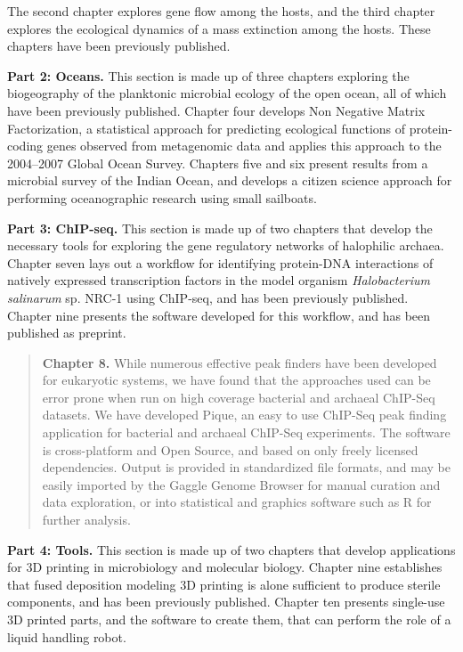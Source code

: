The second chapter explores gene flow among the hosts, \cite{mcgee2016evaluating} and the third chapter explores the ecological dynamics of a mass extinction among the hosts. \cite{mcgee2015pharyngeal} These chapters have been previously published. 

\noindent\textbf{Part 2: Oceans.}
This section is made up of three chapters exploring the biogeography of the planktonic microbial ecology of the open ocean, all of which have been previously published. Chapter four develops Non Negative Matrix Factorization, a statistical approach for predicting ecological functions of protein-coding genes observed from metagenomic data and applies this approach to the 2004--2007 Global Ocean Survey. \cite{jiang2012functional} Chapters five and six present results from a microbial survey of the Indian Ocean, and develops a citizen science approach for performing oceanographic research using small sailboats. \cite{jeffries2015spatially, lauro2014common}

\noindent\textbf{Part 3: ChIP-seq.}
This section is made up of two chapters that develop the necessary tools for exploring the gene regulatory networks of halophilic archaea. Chapter seven lays out a workflow for identifying protein-DNA interactions of natively expressed transcription factors in the model organism {\em Halobacterium salinarum} sp. NRC-1 using ChIP-seq, and has been previously published. \cite{wilbanks2012workflow} Chapter nine presents the software developed for this workflow, and has been published as preprint. \cite{neches2014fit}

\begin{quote} \noindent\textbf{Chapter 8.} While numerous effective peak
finders have been developed for eukaryotic systems, we have found that the
approaches used can be error prone when run on high coverage bacterial and
archaeal ChIP-Seq datasets. We have developed Pique, an easy to use ChIP-Seq
peak finding application for bacterial and archaeal ChIP-Seq experiments. The
software is cross-platform and Open Source, and based on only freely licensed
dependencies. Output is provided in standardized file formats, and may be
easily imported by the Gaggle Genome Browser for manual curation and data
exploration, or into statistical and graphics software such as R for further
analysis. \end{quote}

\noindent\textbf{Part 4: Tools.}
This section is made up of two chapters that develop applications for 3D printing in microbiology and molecular biology. Chapter nine establishes that fused deposition modeling 3D printing is alone sufficient to produce sterile components, and has been previously published. \cite{neches2016intrinsic} Chapter ten presents single-use 3D printed parts, and the software to create them, that can perform the role of a liquid handling robot.

